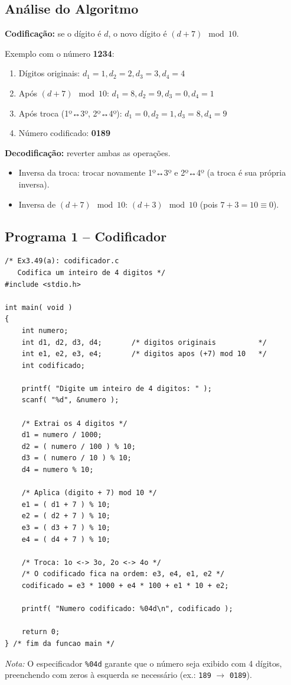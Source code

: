 \documentclass[12pt,a4paper]{article}
\begin{document}
\subsection*{Análise do Algoritmo}

\textbf{Codificação:} se o dígito é $d$, o novo dígito é $(d + 7) \mod 10$.

Exemplo com o número \textbf{1234}:
\begin{enumerate}[noitemsep]
  \item Dígitos originais: $d_1=1, d_2=2, d_3=3, d_4=4$
  \item Após $(d+7) \mod 10$: $d_1=8, d_2=9, d_3=0, d_4=1$
  \item Após troca (1º↔3º, 2º↔4º): $d_1=0, d_2=1, d_3=8, d_4=9$
  \item Número codificado: \textbf{0189}
\end{enumerate}

\textbf{Decodificação:} reverter ambas as operações.
\begin{itemize}[noitemsep]
  \item Inversa da troca: trocar novamente 1º↔3º e 2º↔4º (a troca é sua própria inversa).
  \item Inversa de $(d + 7) \mod 10$: $(d + 3) \mod 10$ (pois $7+3=10\equiv 0$).
\end{itemize}

\subsection*{Programa 1 -- Codificador}

\begin{respostabox}
\begin{lstlisting}
/* Ex3.49(a): codificador.c
   Codifica um inteiro de 4 digitos */
#include <stdio.h>

int main( void )
{
    int numero;
    int d1, d2, d3, d4;       /* digitos originais          */
    int e1, e2, e3, e4;       /* digitos apos (+7) mod 10   */
    int codificado;

    printf( "Digite um inteiro de 4 digitos: " );
    scanf( "%d", &numero );

    /* Extrai os 4 digitos */
    d1 = numero / 1000;
    d2 = ( numero / 100 ) % 10;
    d3 = ( numero / 10 ) % 10;
    d4 = numero % 10;

    /* Aplica (digito + 7) mod 10 */
    e1 = ( d1 + 7 ) % 10;
    e2 = ( d2 + 7 ) % 10;
    e3 = ( d3 + 7 ) % 10;
    e4 = ( d4 + 7 ) % 10;

    /* Troca: 1o <-> 3o, 2o <-> 4o */
    /* O codificado fica na ordem: e3, e4, e1, e2 */
    codificado = e3 * 1000 + e4 * 100 + e1 * 10 + e2;

    printf( "Numero codificado: %04d\n", codificado );

    return 0;
} /* fim da funcao main */
\end{lstlisting}

\textit{Nota:} O especificador \texttt{\%04d} garante que o número seja exibido com
4 dígitos, preenchendo com zeros à esquerda se necessário (ex.: \texttt{189} \(\to\)
\texttt{0189}).
\end{respostabox}
\end{document}
